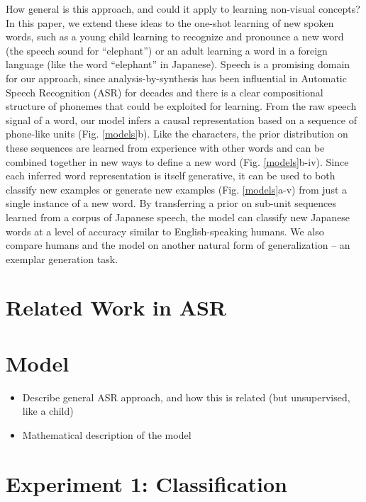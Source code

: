 \documentclass[10pt,letterpaper]{article}
\begin{document}
How general is this approach, and could it apply to learning non-visual concepts? In this paper, we extend these ideas to the one-shot learning of new spoken words, such as a young child learning to recognize and pronounce a new word (the speech sound for ``elephant'') or an adult learning a word in a foreign language (like the word ``elephant'' in Japanese). Speech is a promising domain for our approach, since analysis-by-synthesis has been influential in Automatic Speech Recognition (ASR) for decades \cite{Halle1962,Liberman1967} and there is a clear compositional structure of phonemes that could be exploited for learning. From the raw speech signal of a word, our model infers a causal representation based on a sequence of phone-like units (Fig. \ref{models}b). Like the characters, the prior distribution on these sequences are learned from experience with other words and can be combined together in new ways to define a new word (Fig. \ref{models}b-iv). Since each inferred word representation is itself generative, it can be used to both classify new examples or generate new examples (Fig. \ref{models}a-v) from just a single instance of a new word. By transferring a prior on sub-unit sequences learned from a corpus of Japanese speech, the model can classify new Japanese words at a level of accuracy similar to English-speaking humans. We also compare humans and the model on another natural form of generalization -- an exemplar generation task.


\section{Related Work in ASR}


\section{Model}

\begin{itemize}
\item Describe general ASR approach, and how this is related (but unsupervised, like a child)
\item Mathematical description of the model
\end{itemize}

\section{Experiment 1: Classification}
\end{document}
